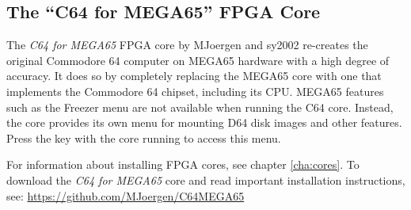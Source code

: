 \subsection{The ``C64 for MEGA65'' FPGA Core}

The {\it C64 for MEGA65} FPGA core by MJoergen and sy2002 re-creates the original Commodore 64 computer on MEGA65 hardware with a high degree of accuracy. It does so by completely replacing the MEGA65 core with one that implements the Commodore 64 chipset, including its CPU. MEGA65 features such as the Freezer menu are not available when running the C64 core. Instead, the core provides its own menu for mounting D64 disk images and other features. Press the  key with the core running to access this menu.


For information about installing FPGA cores, see chapter \vref{cha:cores}. To download the {\it C64 for MEGA65} core and read important installation instructions, see: \url{https://github.com/MJoergen/C64MEGA65}
